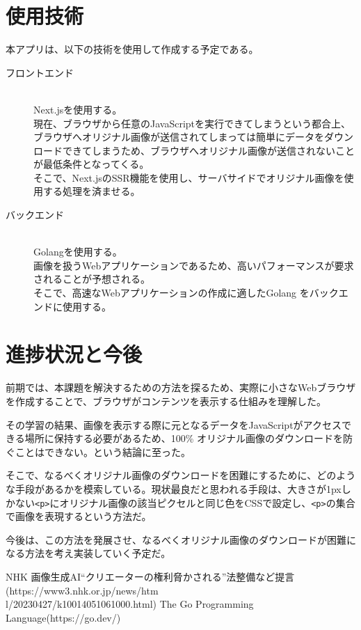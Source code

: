 ﻿\documentclass[twocolumn,a4j]{jarticle}
\begin{document}
\section{使用技術}
本アプリは、以下の技術を使用して作成する予定である。
\begin{description}
  \item[フロントエンド]\mbox{}\\
  Next.jsを使用する。\\
  現在、ブラウザから任意のJavaScriptを実行できてしまうという都合上、ブラウザへオリジナル画像が送信されてしまっては簡単にデータをダウンロードできてしまうため、ブラウザへオリジナル画像が送信されないことが最低条件となってくる。\\
  そこで、Next.jsのSSR機能を使用し、サーバサイドでオリジナル画像を使用する処理を済ませる。
  \item[バックエンド]\mbox{}\\
  Golangを使用する。\\
  画像を扱うWebアプリケーションであるため、高いパフォーマンスが要求されることが予想される。\\
  そこで、高速なWebアプリケーションの作成に適したGolang\cite{go} をバックエンドに使用する。
\end{description}


\section{進捗状況と今後}
前期では、本課題を解決するための方法を探るため、実際に小さなWebブラウザを作成することで、ブラウザがコンテンツを表示する仕組みを理解した。\par
その学習の結果、画像を表示する際に元となるデータをJavaScriptがアクセスできる場所に保持する必要があるため、100\% オリジナル画像のダウンロードを防ぐことはできない。という結論に至った。\par
そこで、なるべくオリジナル画像のダウンロードを困難にするために、どのような手段があるかを模索している。現状最良だと思われる手段は、大きさが1pxしかない\lstinline!<p>!にオリジナル画像の該当ピクセルと同じ色をCSSで設定し、\lstinline|<p>|の集合で画像を表現するという方法だ。\par
今後は、この方法を発展させ、なるべくオリジナル画像のダウンロードが困難になる方法を考え実装していく予定だ。


\begin{thebibliography}{9}\setlength{\itemsep}{-2pt}
   NHK 画像生成AI“クリエーターの権利脅かされる”法整備など提言(https://www3.nhk.or.jp/news/htm\\l/20230427/k10014051061000.html)
   The Go Programming Language(https://go.dev/)
\end{thebibliography}
\end{document}
